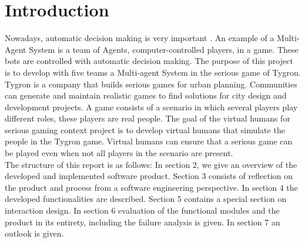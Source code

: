\section{Introduction}
Nowadays, automatic decision making is very important \cite{Lizheng2010}. An example of a Multi-Agent System is a team of Agents, computer-controlled players, in a game. These bots are controlled with automatic decision making. The purpose of this project is to develop with five teams a Multi-agent System in the serious game of Tygron. Tygron is a company that builds serious games for urban planning. Communities can generate and maintain realistic games to find solutions for city design and development projects. A game consists of a scenario in which several players play different roles, these players are real people. The goal of the virtual humans for serious gaming context project is to develop virtual humans that simulate the people in the Tygron game. Virtual humans can ensure that a serious game can be played even when not all players in the scenario are present.\\

The structure of this report is as follows:
In section 2, we give an overview of the developed and implemented software product. Section 3 consists of reflection on the product and process from a software engineering perspective. In section 4 the developed functionalities are described. Section 5 contains a special section on interaction design. In section 6 evaluation of the functional modules and the product in its entirety, including the failure analysis is given. In section 7 an outlook is given.
